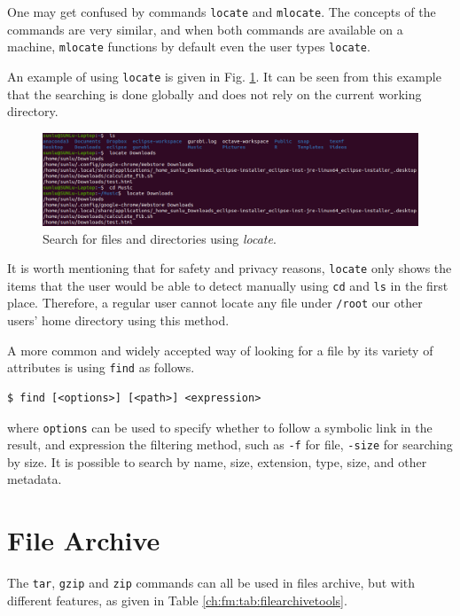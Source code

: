 One may get confused by commands \verb|locate| and \verb|mlocate|. The concepts of the commands are very similar, and when both commands are available on a machine, \verb|mlocate| functions by default even the user types \verb|locate|.

An example of using \verb|locate| is given in Fig. \ref{ch:fm:fig:locateexp}. It can be seen from this example that the searching is done globally and does not rely on the current working directory.
\begin{figure}[htbp]
	\centering
	\includegraphics[width=350pt]{chapters/part-1/figures/locateexp.png}
	\caption{Search for files and directories using \textit{locate}.} \label{ch:fm:fig:locateexp}
\end{figure}

It is worth mentioning that for safety and privacy reasons, \verb|locate| only shows the items that the user would be able to detect manually using \verb|cd| and \verb|ls| in the first place. Therefore, a regular user cannot locate any file under \verb|/root| our other users' home directory using this method.

A more common and widely accepted way of looking for a file by its variety of attributes is using \verb|find| as follows.
\begin{lstlisting}
$ find [<options>] [<path>] <expression>
\end{lstlisting}
where \verb|options| can be used to specify whether to follow a symbolic link in the result, and expression the filtering method, such as \verb|-f| for file, \verb|-size| for searching by size. It is possible to search by name, size, extension, type, size, and other metadata.

\section{File Archive}

The \verb|tar|, \verb|gzip| and \verb|zip| commands can all be used in files archive, but with different features, as given in Table \ref{ch:fm:tab:filearchivetools}.

